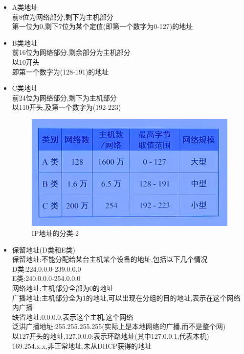 \documentclass[UTF8,a4paper]{ctexart}
\begin{document}
\begin{itemize}
  \item A类地址\\
  前8位为网络部分,剩下为主机部分\\
  第一位为0,剩下7位为某个定值(即第一个数字为0-127)的地址
  \item B类地址\\
  前16位为网络部分,剩余部分为主机部分\\
  以10开头\\
  即第一个数字为(128-191)的地址
  \item C类地址\\
  前24位为网络部分,剩下为主机部分\\
  以110开头,及第一个数字为(192-223)\\
  \begin{figure}[H]
    \centering
    \includegraphics{assets/jisuanjiwangluo_a655d.png}
    \caption{IP地址的分类-2}
  \end{figure}
  \item 保留地址(D类和E类)\\
  保留地址:不能分配给某台主机某个设备的地址,包括以下几个情况\\
  D类:224.0.0.0-239.0.0.0\\
  E类:240.0.0.0-254.0.0.0\\
  网络地址:主机部分全部为0的地址\\
  广播地址:主机部分全为1的地址,可以出现在分组的目的地址,表示在这个网络内广播\\
  缺省地址:0.0.0.0,表示这个主机,这个网络\\
  泛洪广播地址:255.255.255.255(实际上是本地网络的广播,而不是整个网)\\
  以127开头的地址,127.0.0.0:表示环路地址(其中127.0.0.1,代表本机)\\
  169.254.x.x,非正常地址,未从DHCP获得的地址\\
\end{itemize}
\end{document}
